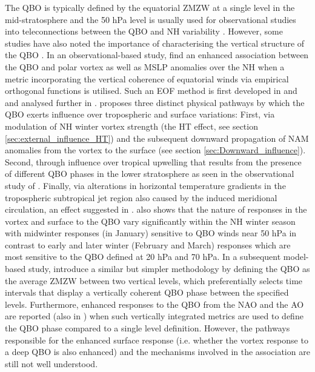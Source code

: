 The QBO is typically defined by the equatorial ZMZW at a single level in the mid-stratosphere and the 50 hPa level is usually used for observational studies into teleconnections between the QBO and NH variability \citep{baldwinQuasiBiennial2001}. However, some studies have also noted the importance of characterising the vertical structure of the QBO \citep{fraedrichEOF1993, wallaceRepresentation1993,  Baldwin98,  Dunkerton2017, graySurface2018b, andrewsObserved2019d}. In an observational-based study, \cite{graySurface2018b} find an enhanced association between the QBO and polar vortex as well as MSLP anomalies over the NH when a metric incorporating the vertical coherence of equatorial winds via empirical orthogonal functions is utilised. Such an EOF method is first developed in \cite{fraedrichEOF1993} and \cite{wallaceRepresentation1993} and analysed further in \cite{verena2016a}. \cite{graySurface2018b} proposes three distinct physical pathways by which the QBO exerts influence over tropospheric and surface variations: First, via modulation of NH winter vortex strength (the HT effect, see section \ref{sec:external_influence_HT}) and the subsequent downward propagation of NAM anomalies from the vortex to the surface (see section \ref{sec:Downward_influence}). Second, through influence over tropical upwelling that results from the presence of different QBO phases in the lower stratosphere as seen in the observational study of \cite{liessRelationship2012}. Finally, via alterations in horizontal temperature gradients in the tropospheric subtropical jet region also caused by the induced meridional circulation, an effect suggested in \cite{garfinkelInfluence2011}. \cite{graySurface2018b} also shows that the nature of responses in the vortex and surface to the QBO vary significantly within the NH winter season with midwinter responses (in January) sensitive to QBO winds near 50 hPa in contrast to early and later winter (February and March) responses which are most sensitive to the QBO defined at 20 hPa and 70 hPa. In a subsequent model-based study, \cite{andrewsObserved2019d} introduce a similar but simpler methodology by defining the QBO as the average ZMZW between two vertical levels, which preferentially selects time intervals that display a vertically coherent QBO phase between the specified levels. Furthermore, enhanced responses to the QBO from the NAO and the AO are reported (also in \cite{andrewsObserved2019d}) when such vertically integrated metrics are used to define the QBO phase compared to a single level definition. However, the pathways responsible for the enhanced surface response (i.e. whether the vortex response to a deep QBO is also enhanced) and the mechanisms involved in the association are still not well understood. 

